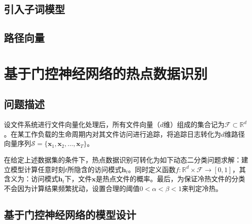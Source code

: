 \subsection{引入子词模型}
\subsection{路径向量}
\section{基于门控神经网络的热点数据识别}
\subsection{问题描述}
%

设文件系统进行文件向量化处理后，所有文件向量（$d$维）组成的集合记为$\mathcal{F} \subset \mathbb{R}^d$。在某工作负载的生命周期内对其文件访问进行追踪，将追踪日志转化为$d$维路径向量序列$\mathcal{S}=\{\mathbf{x}_1, \mathbf{x}_2,\dots, \mathbf{x}_T\}$。

在给定上述数据集的条件下，热点数据识别可转化为如下动态二分类问题求解：建立模型计算任意时刻$t$所隐含的访问模式$\mathbf{h}_t$。同时定义函数$f:\mathbb{R}^d \times \mathcal{F} \rightarrow [0,1]$，其含义为：访问模式$\mathbf{h}_t$下，文件$\mathbf{x}$是热点文件的概率。最后，为保证冷热文件的分类不会因为计算结果频繁扰动，设置合理的阈值$0<\alpha<\beta<1$来判定冷热。


\subsection{基于门控神经网络的模型设计}

